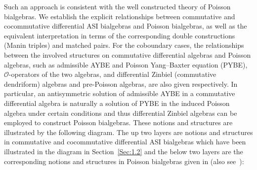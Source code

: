 \documentclass[10pt,a4paper]{amsart}
\numberwithin{equation}{section}
\begin{document}
Such an approach is consistent with the well constructed theory of
Poisson bialgebras. We establish the explicit relationships
between commutative and cocommutative differential ASI bialgebras
and Poisson bialgebras, as well as the equivalent interpretation
in terms of the corresponding double constructions (Manin triples)
and matched pairs. For the coboundary cases, the relationships
between the involved structures on commutative differential
algebras and Poisson algebras, such as admissible AYBE and Poisson
Yang--Baxter equation (PYBE), $\mathcal{O}$-operators of the two
algebras, and differential Zinbiel (commutative dendriform)
algebras and pre-Poisson algebras, are also given respectively. In particular,
an antisymmetric solution of admissible AYBE in a commutative
differential algebra is naturally a solution of PYBE in the
induced Poisson algebra under certain conditions and thus
differential Zinbiel algebras can be employed to construct Poisson
bialgebras. These notions and structures are illustrated by the
following diagram. The up two layers are notions and structures in
commutative and cocommutative differential ASI bialgebras which
have been illustrated in the diagram in Section~\ref{Sec:1.2} and
the below two layers are the corresponding notions and structures
in Poisson bialgebras given in \cite{ni2013poisson} (also see~\cite{liu2020noncommutative}):
\end{document}

